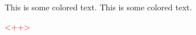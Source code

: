 
\textcolor{Mycolor1}{This is some colored text.}
\textcolor{Mycolor2}{This is some colored text.}

\textcolor{red}{<++>}

